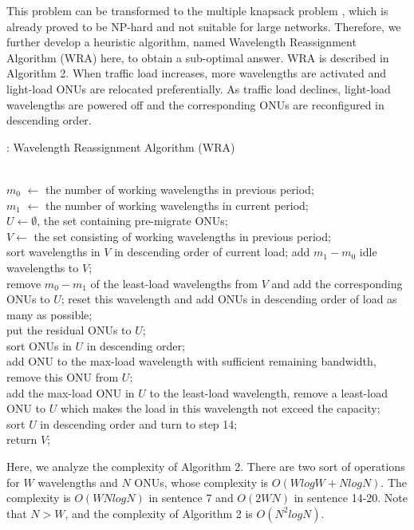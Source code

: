 \documentclass[letter]{IEEEtran}
\begin{document}
This problem can be transformed to the multiple knapsack problem \cite{dawande2000approximation}, which is already proved to be NP-hard and not suitable for large networks. Therefore, we further develop a heuristic algorithm, named Wavelength Reassignment Algorithm (WRA) here, to obtain a sub-optimal answer. WRA is described in Algorithm 2. When traffic load increases, more wavelengths are activated and light-load ONUs are relocated preferentially. As traffic load declines, light-load wavelengths are powered off and the corresponding ONUs are reconfigured in descending order.

\begin{algorithm}[h]
    \scriptsize
	\caption{: Wavelength Reassignment Algorithm (WRA)}
	\begin{algorithmic}[1]
		\REQUIRE ~~\\
		$ m_{0} $ $ \leftarrow $ the number of working wavelengths in previous period;\\
		$ m_{1} $ $ \leftarrow $ the number of working wavelengths in current period;\\
	    $ U \leftarrow \emptyset$, the set containing pre-migrate ONUs;\\
	    $ V \leftarrow$ the set consisting of working wavelengths in previous period;\\
        \STATE sort wavelengths in $ V $ in descending order of current load;
	        \STATE add $ m_{1} - m_{0} $ idle wavelengths to $ V $;\\
        \ELSE
	        \STATE remove $ m_{0} - m_{1} $ of the least-load wavelengths from $ V $ and add the corresponding ONUs to $ U $;
	    \ENDIF
		        \STATE reset this wavelength and add ONUs in descending order of load as many as possible;\\
		        \STATE put the residual ONUs to $ U $;\\
		    \ENDIF
		\ENDFOR
		\STATE sort ONUs in $ U $ in descending order;\\
			\STATE add ONU to the max-load wavelength with sufficient remaining bandwidth, remove this ONU from $ U $;\\
		\ENDFOR
			\STATE add the max-load ONU in $ U $ to the least-load wavelength, remove a least-load ONU to $ U $ which makes the load in this wavelength not exceed the capacity;\\
			\STATE sort $U$ in descending order and turn to step 14;\\
		\ENDWHILE
		\STATE return $ V $;\\
	\end{algorithmic}
\end{algorithm}
\vspace{-3.0mm}
Here, we analyze the complexity of Algorithm 2. There are two sort of operations for $W$ wavelengths and $N$ ONUs, whose complexity is $O(WlogW + NlogN)$. The complexity is $O(WNlogN)$ in sentence 7 and $O(2WN)$ in sentence 14-20. Note that $N > W$, and the complexity of Algorithm 2 is $O(N^2logN)$.
\vspace{-3.0mm}
\end{document}
